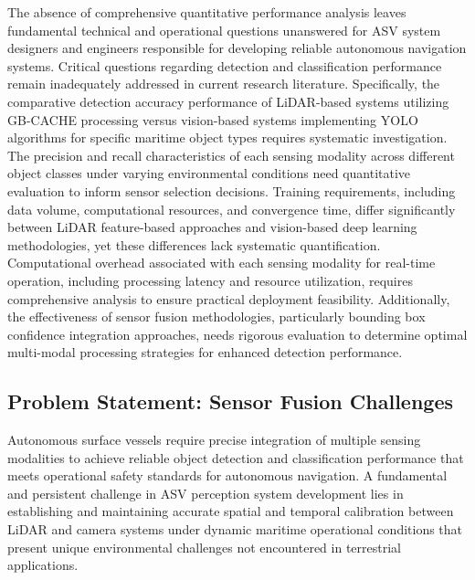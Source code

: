 \documentclass{erauthesis}
\begin{document}
The absence of comprehensive quantitative performance analysis leaves fundamental technical and operational questions unanswered for ASV system designers and engineers responsible for developing reliable autonomous navigation systems. Critical questions regarding detection and classification performance remain inadequately addressed in current research literature. Specifically, the comparative detection accuracy performance of LiDAR-based systems utilizing GB-CACHE processing versus vision-based systems implementing YOLO algorithms for specific maritime object types requires systematic investigation. The precision and recall characteristics of each sensing modality across different object classes under varying environmental conditions need quantitative evaluation to inform sensor selection decisions. Training requirements, including data volume, computational resources, and convergence time, differ significantly between LiDAR feature-based approaches and vision-based deep learning methodologies, yet these differences lack systematic quantification. Computational overhead associated with each sensing modality for real-time operation, including processing latency and resource utilization, requires comprehensive analysis to ensure practical deployment feasibility. Additionally, the effectiveness of sensor fusion methodologies, particularly bounding box confidence integration approaches, needs rigorous evaluation to determine optimal multi-modal processing strategies for enhanced detection performance.

\subsection{Problem Statement: Sensor Fusion Challenges}

Autonomous surface vessels require precise integration of multiple sensing modalities to achieve reliable object detection and classification performance that meets operational safety standards for autonomous navigation. A fundamental and persistent challenge in ASV perception system development lies in establishing and maintaining accurate spatial and temporal calibration between LiDAR and camera systems under dynamic maritime operational conditions that present unique environmental challenges not encountered in terrestrial applications.
\end{document}
